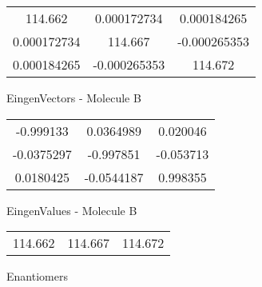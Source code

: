 \begin{multicols}{2}
\begin{center}
\begin{tabular}{|c c c|}
114.662	 & 	0.000172734	 & 	0.000184265	 \\
0.000172734	 & 	114.667	 & 	-0.000265353	 \\
0.000184265	 & 	-0.000265353	 & 	114.672
\end{tabular}

\vtab
 EingenVectors - Molecule B     \\
\vtab
\begin{tabular}{|c c c|}
-0.999133	 & 	0.0364989	 & 	0.020046	 \\
-0.0375297	 & 	-0.997851	 & 	-0.053713	 \\
0.0180425	 & 	-0.0544187	 & 	0.998355
\end{tabular}

\vtab
 EingenValues - Molecule B     \\
\vtab
\begin{tabular}{|c c c|}
114.662	 & 	114.667	 & 	114.672	 \\
\end{tabular}

\end{center}
\end{multicols}
\begin{center}
\vtab
\vtab
\textcolor{NavyBlue}{\Large Enantiomers}
\end{center}

 \newpage

